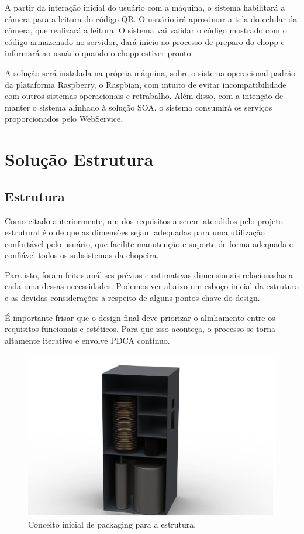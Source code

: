 				A partir da interação inicial do usuário com a máquina, o sistema habilitará a câmera para a leitura do código QR. O usuário irá aproximar a tela do celular da câmera, que realizará a leitura. O sistema vai validar o código mostrado com o código armazenado no servidor, dará início ao processo de preparo do chopp e informará ao usuário quando o chopp estiver pronto.
				
				A solução será instalada na própria máquina, sobre o sistema operacional padrão da plataforma Raspberry, o Raspbian, com intuito de evitar incompatibilidade com outros sistemas operacionais e retrabalho. Além disso, com a intenção de manter o sistema alinhado à solução SOA, o sistema consumirá os serviços proporcionados pelo WebService. 


	\section[Solução Estrutura]{Solução Estrutura}

		\subsection[Estrutura]{Estrutura}
				Como citado anteriormente, um dos requisitos a serem atendidos pelo projeto estrutural é o de que as dimensões sejam adequadas para uma utilização confortável pelo usuário, que facilite manutenção e suporte de forma adequada e confiável todos os subsistemas da chopeira.
				
				Para isto, foram feitas análises prévias e estimativas dimensionais relacionadas a cada uma dessas necessidades. Podemos ver abaixo um esboço inicial da estrutura e as devidas considerações a respeito de alguns pontos chave do design.
				
				É importante frisar que o design final deve priorizar o alinhamento entre os requisitos funcionais e estéticos. Para que isso aconteça, o processo se torna altamente iterativo e envolve PDCA contínuo.

				\begin{figure}[H]
					\centering
					\includegraphics[scale= 0.7]{figuras/packaging-estrutura.png}
					\caption{Conceito inicial de packaging para a estrutura.}
					\label{packaging-estrutura}
				\end{figure}

